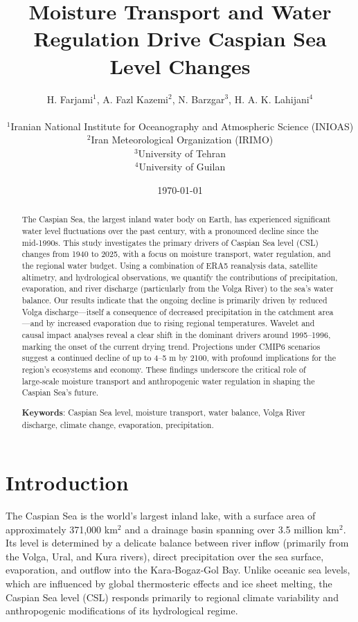 \documentclass[12pt,a4paper]{article}
\title{\textbf{Moisture Transport and Water Regulation Drive Caspian Sea Level Changes}}
\author{
    H. Farjami$^{1}$,
    A. Fazl Kazemi$^{2}$,
    N. Barzgar$^{3}$,
    H. A. K. Lahijani$^{4}$
    \\
    \\
    $^{1}$Iranian National Institute for Oceanography and Atmospheric Science (INIOAS) \\
    $^{2}$Iran Meteorological Organization (IRIMO) \\
    $^{3}$University of Tehran \\
    $^{4}$University of Guilan
}
\date{\today}
\begin{document}
\maketitle

\begin{abstract}
The Caspian Sea, the largest inland water body on Earth, has experienced significant water level fluctuations over the past century, with a pronounced decline since the mid‑1990s. This study investigates the primary drivers of Caspian Sea level (CSL) changes from 1940 to 2025, with a focus on moisture transport, water regulation, and the regional water budget. Using a combination of ERA5 reanalysis data, satellite altimetry, and hydrological observations, we quantify the contributions of precipitation, evaporation, and river discharge (particularly from the Volga River) to the sea's water balance. Our results indicate that the ongoing decline is primarily driven by reduced Volga discharge—itself a consequence of decreased precipitation in the catchment area—and by increased evaporation due to rising regional temperatures. Wavelet and causal impact analyses reveal a clear shift in the dominant drivers around 1995–1996, marking the onset of the current drying trend. Projections under CMIP6 scenarios suggest a continued decline of up to 4–5 m by 2100, with profound implications for the region's ecosystems and economy. These findings underscore the critical role of large‑scale moisture transport and anthropogenic water regulation in shaping the Caspian Sea's future.

\noindent\textbf{Keywords}: Caspian Sea level, moisture transport, water balance, Volga River discharge, climate change, evaporation, precipitation.
\end{abstract}

\section{Introduction}

The Caspian Sea is the world's largest inland lake, with a surface area of approximately 371,000 km\(^2\) and a drainage basin spanning over 3.5 million km\(^2\). Its level is determined by a delicate balance between river inflow (primarily from the Volga, Ural, and Kura rivers), direct precipitation over the sea surface, evaporation, and outflow into the Kara‑Bogaz‑Gol Bay. Unlike oceanic sea levels, which are influenced by global thermosteric effects and ice sheet melting, the Caspian Sea level (CSL) responds primarily to regional climate variability and anthropogenic modifications of its hydrological regime.
\end{document}
